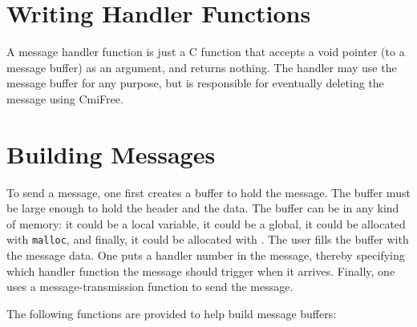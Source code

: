 
\section{Writing Handler Functions}
\label{handler2}

A message handler function is just a C function that accepts a void
pointer (to a message buffer) as an argument, and returns nothing.  The
handler may use the message buffer for any purpose, but is responsible
for eventually deleting the message using CmiFree.

\section{Building Messages}

To send a message, one first creates a buffer to hold the message.
The buffer must be large enough to hold the header and the data.
The buffer can be in any kind of memory: it could be a local variable,
it could be a global, it could be allocated with {\tt malloc}, and
finally, it could be allocated with .  The \converse{} user
fills the buffer with the message data.  One puts a handler number
in the message, thereby specifying which handler function the message
should trigger when it arrives.  Finally, one uses a message-transmission
function to send the message.

The following functions are provided to help build message buffers:




